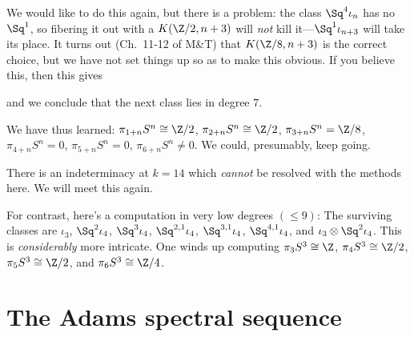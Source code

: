 We would like to do this again, but there is a problem: the class $\Sq^4 \iota_n$ has no $\Sq^1$, so fibering it out with a $K(\Z/2, n+3)$ will \emph{not} kill it---$\Sq^1 \iota_{n+3}$ will take its place.  It turns out (Ch.\ 11-12 of M\&T) that $K(\Z/8, n+3)$ is the correct choice, but we have not set things up so as to make this obvious.  If you believe this, then this gives
\begin{center}
\end{center} 
and we conclude that the next class lies in degree $7$.

We have thus learned: $\pi_{1+n} S^n \cong \Z/2$, $\pi_{2+n} S^n \cong \Z/2$, $\pi_{3+n} S^n = \Z/8$, $\pi_{4+n} S^n = 0$, $\pi_{5+n} S^n = 0$, $\pi_{6+n} S^n \ne 0$.  We could, presumably, keep going.

\begin{remark}
There is an indeterminacy at $k = 14$ which \emph{cannot} be resolved with the methods here.  We will meet this again.
\end{remark}

\begin{remark}
For contrast, here's a computation in very low degrees $(\le 9)$:
The surviving classes are $\iota_3$, $\Sq^2 \iota_4$, $\Sq^3 \iota_4$, $\Sq^{2,1} \iota_4$, $\Sq^{3,1} \iota_4$, $\Sq^{4,1} \iota_4$, and $\iota_3 \otimes \Sq^2 \iota_4$.  This is \emph{considerably} more intricate.  One winds up computing $\pi_3 S^3 \cong \Z$, $\pi_4 S^3 \cong \Z/2$, $\pi_5 S^3 \cong \Z/2$, and $\pi_6 S^3 \cong \Z/4$.
\end{remark}





\section{The Adams spectral sequence}

